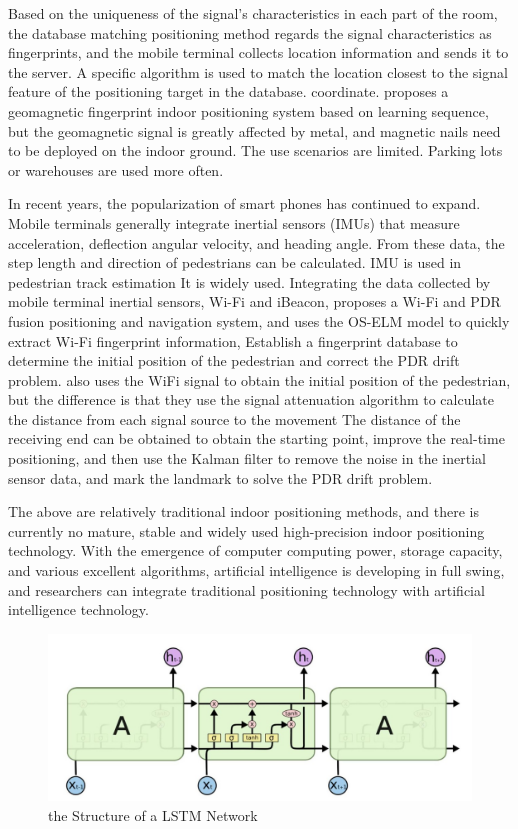 \documentclass[conference]{IEEEtran}
\begin{document}
Based on the uniqueness of the signal's characteristics in each part of the room, the database matching positioning method regards the signal characteristics as fingerprints, and the mobile terminal collects location information and sends it to the server. A specific algorithm is used to match the location closest to the signal feature of the positioning target in the database. coordinate. \cite{indoor-fp1}\cite{indoor-fp1} proposes a geomagnetic fingerprint indoor positioning system based on learning sequence, but the geomagnetic signal is greatly affected by metal, and magnetic nails need to be deployed on the indoor ground. The use scenarios are limited. Parking lots or warehouses are used more often.

In recent years, the popularization of smart phones has continued to expand. Mobile terminals generally integrate inertial sensors (IMUs) that measure acceleration, deflection angular velocity, and heading angle. From these data, the step length and direction of pedestrians can be calculated. IMU is used in pedestrian track estimation It is widely used.\cite{indoor-imu1} Integrating the data collected by mobile terminal inertial sensors, Wi-Fi and iBeacon, proposes a Wi-Fi and PDR fusion positioning and navigation system, and uses the OS-ELM model to quickly extract Wi-Fi fingerprint information, Establish a fingerprint database to determine the initial position of the pedestrian and correct the PDR drift problem.\cite{indoor-imu2} also uses the WiFi signal to obtain the initial position of the pedestrian, but the difference is that they use the signal attenuation algorithm to calculate the distance from each signal source to the movement The distance of the receiving end can be obtained to obtain the starting point, improve the real-time positioning, and then use the Kalman filter to remove the noise in the inertial sensor data, and mark the landmark to solve the PDR drift problem.

The above are relatively traditional indoor positioning methods, and there is currently no mature, stable and widely used high-precision indoor positioning technology. \cite{indoor-no} With the emergence of computer computing power, storage capacity, and various excellent algorithms, artificial intelligence is developing in full swing, and researchers can integrate traditional positioning technology with artificial intelligence technology.

\begin{figure}[h]
	\centering
	\includegraphics[scale=0.3]{./figures/lstm.jpg}
	\caption{the Structure of a LSTM Network}
	\label{fig:lstm}
\end{figure}
\end{document}

